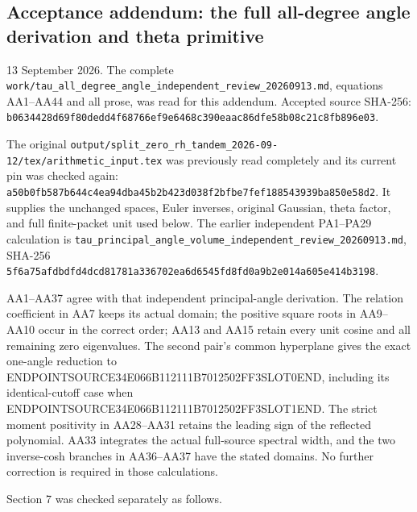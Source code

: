 \subsection{Acceptance addendum: the full all-degree angle derivation and theta primitive}\label{endpoint-angle_primitive_acceptance--acceptance-addendum-the-full-all-degree-angle-derivation-and-theta-primitive}

13 September 2026. The complete \texttt{work/tau\_all\_degree\_angle\_independent\_review\_20260913.md}, equations AA1--AA44 and all prose, was read for this addendum. Accepted source SHA-256: \texttt{b0634428d69f80dedd4f68766ef9e6468c390eaac86dfe58b08c21c8fb896e03}.

The original \texttt{output/split\_zero\_rh\_tandem\_2026-09-12/tex/arithmetic\_input.tex} was previously read completely and its current pin was checked again: \texttt{a50b0fb587b644c4ea94dba45b2b423d038f2bfbe7fef188543939ba850e58d2}. It supplies the unchanged spaces, Euler inverses, original Gaussian, theta factor, and full finite-packet unit used below. The earlier independent PA1--PA29 calculation is \texttt{tau\_principal\_angle\_volume\_independent\_review\_20260913.md}, SHA-256 \texttt{5f6a75afdbdfd4dcd81781a336702ea6d6545fd8fd0a9b2e014a605e414b3198}.

AA1--AA37 agree with that independent principal-angle derivation. The relation coefficient in AA7 keeps its actual domain; the positive square roots in AA9--AA10 occur in the correct order; AA13 and AA15 retain every unit cosine and all remaining zero eigenvalues. The second pair's common hyperplane gives the exact one-angle reduction to ENDPOINTSOURCE34E066B112111B7012502FF3SLOT0END, including its identical-cutoff case when ENDPOINTSOURCE34E066B112111B7012502FF3SLOT1END. The strict moment positivity in AA28--AA31 retains the leading sign of the reflected polynomial. AA33 integrates the actual full-source spectral width, and the two inverse-cosh branches in AA36--AA37 have the stated domains. No further correction is required in those calculations.

Section 7 was checked separately as follows.

